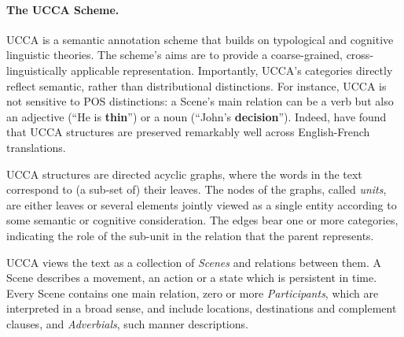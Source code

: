 \documentclass[a4paper, 11pt]{article}
\newcommand{\com}[1]{}
\begin{document}
\vspace{-.2cm}
\paragraph{The UCCA Scheme.}\label{sec:ucca}
UCCA is a semantic annotation scheme that builds on
typological and cognitive linguistic theories.
The scheme's aims are to provide a coarse-grained, cross-linguistically
applicable representation.
Importantly, UCCA's categories directly reflect semantic, rather than
distributional distinctions.
For instance, UCCA is not sensitive to POS distinctions:
a Scene's main relation can be a verb but also an adjective
(``He is {\bf thin}'') or a noun (``John's {\bf decision}'').
Indeed,  have found that UCCA structures are
preserved remarkably well across English-French translations. 

UCCA structures are directed acyclic graphs, where the words in the text 
correspond to (a sub-set of) their leaves.
The nodes of the graphs, called {\it units}, are either leaves or several elements jointly
viewed as a single entity according to some semantic or cognitive consideration.
The edges bear one or more categories, indicating the role of 
the sub-unit in the relation that the parent represents.

UCCA views the text as a collection of {\it Scenes} and relations between them.
A Scene describes a movement, 
an action or a state which is persistent in time.
Every Scene contains one main relation, 
zero or more {\it Participants}, 
which are interpreted in a broad sense, 
and include locations, destinations and complement clauses,
and {\it Adverbials}, such manner descriptions.

\com{
\begin{figure}[t]
				\begin{tikzpicture}[sibling distance=10mm, level distance=10mm, ->,
				every node/.append style={midway},
				every circle node/.append style={fill=black}]
				{
					\node (Source) [circle] {}
					child {node (He) {He} edge from parent node[left] {\scriptsize A}
					}
					child {node (gave) {gve} edge from parent node[right] {\scriptsize A}}
					child {node (an apple) [circle] {}
						{
							child {node (an) {an} edge from parent node[left] {\scriptsize E}}
							child {node (apple){apple} edge from parent node[right] {\scriptsize C}}
						} edge from parent node[right] {\scriptsize P} }
					;}
					\end{tikzpicture}

		\end{figure}}
		
\end{document}
